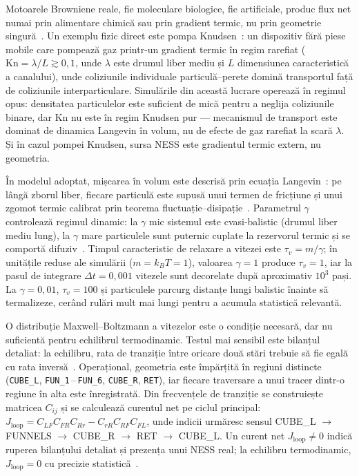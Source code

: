 \documentclass[12pt,openright,twoside]{book}
\begin{document}
Motoarele Browniene reale, fie moleculare biologice, fie artificiale, produc flux net numai prin alimentare chimică sau prin gradient termic, nu prin geometrie singură~\cite{astumian2002,hanggi2009}. Un exemplu fizic direct este pompa Knudsen~\cite{knudsen1909,karniadakis2005}: un dispozitiv fără piese mobile care pompează gaz printr-un gradient termic în regim rarefiat ($\text{Kn} = \lambda/L \gtrsim 0{,}1$, unde $\lambda$ este drumul liber mediu și $L$ dimensiunea caracteristică a canalului), unde coliziunile individuale particulă--perete domină transportul față de coliziunile interparticulare. Simulările din această lucrare operează în regimul opus: densitatea particulelor este suficient de mică pentru a neglija coliziunile binare, dar $\text{Kn}$ nu este în regim Knudsen pur — mecanismul de transport este dominat de dinamica Langevin în volum, nu de efecte de gaz rarefiat la scară $\lambda$. Și în cazul pompei Knudsen, sursa NESS este gradientul termic extern, nu geometria.

În modelul adoptat, mișcarea în volum este descrisă prin ecuația Langevin~\cite{langevin1908,einstein1905}: pe lângă zborul liber, fiecare particulă este supusă unui termen de fricțiune și unui zgomot termic calibrat prin teorema fluctuație--disipație~\cite{kubo1966}. Parametrul $\gamma$ controlează regimul dinamic: la $\gamma$ mic sistemul este cvasi-balistic (drumul liber mediu lung), la $\gamma$ mare particulele sunt puternic cuplate la rezervorul termic și se comportă difuziv~\cite{gardiner2009}. Timpul caracteristic de relaxare a vitezei este $\tau_v = m/\gamma$; în unitățile reduse ale simulării ($m = k_BT = 1$), valoarea $\gamma = 1$ produce $\tau_v = 1$, iar la pasul de integrare $\Delta t = 0{,}001$ vitezele sunt decorelate după aproximativ $10^3$ pași. La $\gamma = 0{,}01$, $\tau_v = 100$ și particulele parcurg distanțe lungi balistic înainte să termalizeze, cerând rulări mult mai lungi pentru a acumula statistică relevantă.

O distribuție Maxwell--Boltzmann a vitezelor este o condiție necesară, dar nu suficientă pentru echilibrul termodinamic. Testul mai sensibil este bilanțul detaliat: la echilibru, rata de tranziție între oricare două stări trebuie să fie egală cu rata inversă~\cite{onsager1931,maes2021}. Operațional, geometria este împărțită în regiuni distincte (\texttt{CUBE\_L}, \texttt{FUN\_1}\,--\,\texttt{FUN\_6}, \texttt{CUBE\_R}, \texttt{RET}), iar fiecare traversare a unui tracer dintr-o regiune în alta este înregistrată. Din frecvențele de tranziție se construiește matricea $C_{ij}$ și se calculează curentul net pe ciclul principal: $J_\text{loop} = C_{LF} C_{FR} C_{Rr} - C_{rR} C_{RF} C_{FL}$, unde indicii urmăresc sensul CUBE\_L $\to$ FUNNELS $\to$ CUBE\_R $\to$ RET $\to$ CUBE\_L. Un curent net $J_\text{loop} \neq 0$ indică ruperea bilanțului detaliat și prezența unui NESS real; la echilibru termodinamic, $J_\text{loop} = 0$ cu precizie statistică~\cite{jiang2004,maes2021}.
\end{document}
